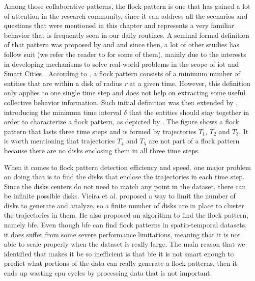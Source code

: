 Among those collaborative patterns, the flock pattern is one that has gained a lot of attention in the research
community, since it can address all the scenarios and questions that were mentioned in this chapter and represents a
very familiar behavior that is frequently seen in our daily routines. A seminal formal definition of that pattern was
proposed by \citep{remo} and \citep{gudefficient} and since then, a lot of other studies has follow suit (we refer the
reader to  for some of them), mainly due to the interests in developing mechanisms to solve
real-world problems in the scope of \ac{iot} \citep{iot} and Smart Cities \citep{smartcities}.  According to
\citep{gudefficient}, a flock pattern consists of a minimum number of entities that are within a disk of radius
\textit{r} at a given time.  However, this definition only applies to one single time step and does not help on
extracting some useful collective behavior information. Such initial definition was then extended by
\citep{gudreportingflock}, introducing the minimum time interval $\delta$ that the entities should stay together in
order to characterize a flock pattern, as depicted by . The figure shows a flock pattern that lasts
three time steps and is formed by trajectories $T_1$, $T_2$ and $T_3$. It is worth mentioning that trajectories $T_4$
and $T_5$ are not part of a flock pattern because there are no disks enclosing them in all three time steps.

When it comes to flock pattern detection efficiency and speed, one major problem on doing that is to find the disks that
enclose the trajectories in each time step. Since the disks centers do not need to match any point in the dataset, there
can be infinite possible disks. Vieira et al. \citep{vieira} proposed a way to limit the number of disks to generate and
analyze, so a finite number of disks are in place to cluster the trajectories in them. He also proposed an algorithm to
find the flock pattern, namely \ac{bfe}. Even though \ac{bfe} can find flock patterns in spatio-temporal datasets, it
does suffer from some severe performance limitations, meaning that it is not able to scale properly when the dataset is
really large. The main reason that we identified that makes it be so inefficient is that \ac{bfe} it is not smart enough
to predict what portions of the data can really generate a flock patterns, then it ends up wasting \ac{cpu} cycles by
processing data that is not important.

